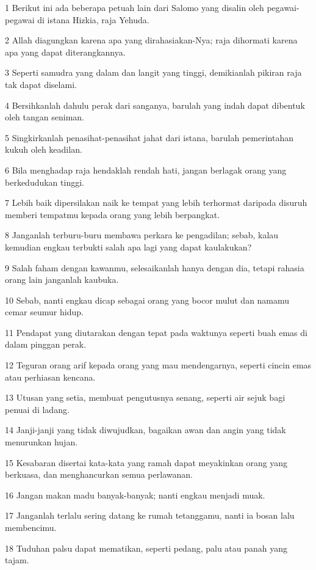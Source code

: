 \par 1 Berikut ini ada beberapa petuah lain dari Salomo yang disalin oleh pegawai-pegawai di istana Hizkia, raja Yehuda.
\par 2 Allah diagungkan karena apa yang dirahasiakan-Nya; raja dihormati karena apa yang dapat diterangkannya.
\par 3 Seperti samudra yang dalam dan langit yang tinggi, demikianlah pikiran raja tak dapat diselami.
\par 4 Bersihkanlah dahulu perak dari sanganya, barulah yang indah dapat dibentuk oleh tangan seniman.
\par 5 Singkirkanlah penasihat-penasihat jahat dari istana, barulah pemerintahan kukuh oleh keadilan.
\par 6 Bila menghadap raja hendaklah rendah hati, jangan berlagak orang yang berkedudukan tinggi.
\par 7 Lebih baik dipersilakan naik ke tempat yang lebih terhormat daripada disuruh memberi tempatmu kepada orang yang lebih berpangkat.
\par 8 Janganlah terburu-buru membawa perkara ke pengadilan; sebab, kalau kemudian engkau terbukti salah apa lagi yang dapat kaulakukan?
\par 9 Salah faham dengan kawanmu, selesaikanlah hanya dengan dia, tetapi rahasia orang lain janganlah kaubuka.
\par 10 Sebab, nanti engkau dicap sebagai orang yang bocor mulut dan namamu cemar seumur hidup.
\par 11 Pendapat yang diutarakan dengan tepat pada waktunya seperti buah emas di dalam pinggan perak.
\par 12 Teguran orang arif kepada orang yang mau mendengarnya, seperti cincin emas atau perhiasan kencana.
\par 13 Utusan yang setia, membuat pengutusnya senang, seperti air sejuk bagi penuai di ladang.
\par 14 Janji-janji yang tidak diwujudkan, bagaikan awan dan angin yang tidak menurunkan hujan.
\par 15 Kesabaran disertai kata-kata yang ramah dapat meyakinkan orang yang berkuasa, dan menghancurkan semua perlawanan.
\par 16 Jangan makan madu banyak-banyak; nanti engkau menjadi muak.
\par 17 Janganlah terlalu sering datang ke rumah tetanggamu, nanti ia bosan lalu membencimu.
\par 18 Tuduhan palsu dapat mematikan, seperti pedang, palu atau panah yang tajam.
